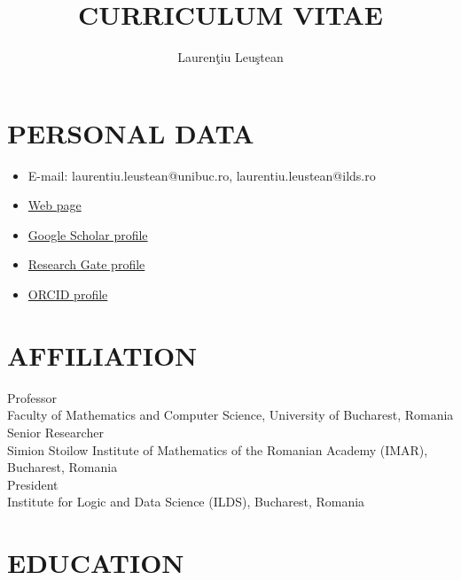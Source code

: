 \documentclass[12pt]{article}
\title{CURRICULUM VITAE}
\author{Lauren\c tiu Leu\c stean}
\date{}
\newcommand{\imar}{Simion Stoilow Institute of Mathematics  of the Romanian Academy (IMAR)}
\begin{document}
\maketitle

\section*{PERSONAL DATA}
\begin{itemize}
\item E-mail: laurentiu.leustean@unibuc.ro, laurentiu.leustean@ilds.ro
\item \href{https://laurentiuleustean.github.io}{Web page}
\item \href{https://scholar.google.com/citations?user=ZjuOO-gAAAAJ&hl=en&oi=ao}{Google Scholar profile}
\item \href{https://www.researchgate.net/profile/Laurentiu-Leustean}{Research Gate profile}
\item \href{https://orcid.org/0000-0003-4154-8761}{ORCID profile}
\end{itemize}


\section*{AFFILIATION}
Professor\\
Faculty of Mathematics and Computer Science, University of Bucharest, Romania\\[2mm]
Senior Researcher\\
\imar, Bucharest, Romania\\[2mm]
President\\
Institute for Logic and Data Science (ILDS), Bucharest, Romania\\[2mm]



\section*{EDUCATION}
\end{document}

